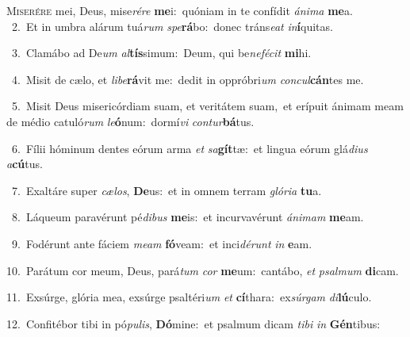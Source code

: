 \lettrine{\initial\textcolor{\initialcolor}{M}}{iserére} mei, Deus, mise\-\textit{ré}\-\textit{re} \textbf{me}\-i:~\star quóniam in te confídit \textit{á}\-\textit{ni}\textit{ma} \textbf{me}\-a.\\
{\numbfont\textcolor{\numbcolor}{~2.}}~Et in umbra alárum tuá\textit{rum} \textit{spe}\-\textbf{rá}bo:~\star donec tráns\-\textit{e}\-\textit{at} \textit{in}\-\textbf{í}quitas.\par
{\numbfont\textcolor{\numbcolor}{~3.}}~Clamábo ad De\textit{um} \textit{al}\-\textbf{tís}simum:~\star Deum, qui be\-\textit{ne}\-\textit{fé}\textit{cit} \textbf{mi}\-hi.\par
{\numbfont\textcolor{\numbcolor}{~4.}}~Misit de cælo, et \textit{li}\-\textit{be}\textbf{rá}vit me:~\star dedit in oppróbri\textit{um} \textit{con}\-\textit{cul}\textbf{cán}tes me.\par
{\numbfont\textcolor{\numbcolor}{~5.}}~Misit Deus misericórdiam suam, et veritátem suam,~\dagger et erípuit ánimam meam de médio catuló\textit{rum} \textit{le}\-\textbf{ó}num:~\star dormí\textit{vi} \textit{con}\-\textit{tur}\textbf{bá}tus.\par
{\numbfont\textcolor{\numbcolor}{~6.}}~Fílii hóminum dentes eórum arma \textit{et} \textit{sa}\-\textbf{gít}tæ:~\star et lingua eórum glá\-\textit{di}\-\textit{us} \textit{a}\-\textbf{cú}tus.\par
{\numbfont\textcolor{\numbcolor}{~7.}}~Exaltáre super \textit{cæ}\-\textit{los}, \textbf{De}\-us:~\star et in omnem terram \textit{gló}\-\textit{ri}\textit{a} \textbf{tu}\-a.\par
{\numbfont\textcolor{\numbcolor}{~8.}}~Láqueum paravérunt pé\-\textit{di}\-\textit{bus} \textbf{me}\-is:~\star et incurvavérunt \textit{á}\-\textit{ni}\textit{mam} \textbf{me}\-am.\par
{\numbfont\textcolor{\numbcolor}{~9.}}~Fodérunt ante fáciem \textit{me}\-\textit{am} \textbf{fó}\-veam:~\star et inci\-\textit{dé}\-\textit{runt} \textit{in} \textbf{e}\-am.\par
{\numbfont\textcolor{\numbcolor}{10.}}~Parátum cor meum, Deus, pará\textit{tum} \textit{cor} \textbf{me}\-um:~\star cantábo, \textit{et} \textit{psal}\-\textit{mum} \textbf{di}\-cam.\par
{\numbfont\textcolor{\numbcolor}{11.}}~Exsúrge, glória mea, exsúrge psaltéri\textit{um} \textit{et} \textbf{cí}\-thara:~\star ex\-\textit{súr}\-\textit{gam} \textit{di}\-\textbf{lú}culo.\par
{\numbfont\textcolor{\numbcolor}{12.}}~Confitébor tibi in pó\-\textit{pu}\-\textit{lis}, \textbf{Dó}\-mine:~\star et psalmum dicam \textit{ti}\-\textit{bi} \textit{in} \textbf{Gén}\-tibus:\par
